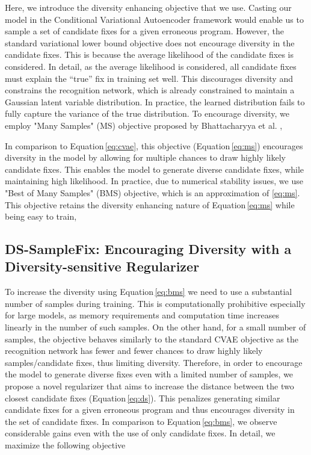 \documentclass[runningheads]{llncs}
\newcommand{\dssmaplefix}{DS-SampleFix}
\newcommand{\equref}{Equation}
\begin{document}
Here, we introduce the diversity enhancing objective that we use. Casting our model in the Conditional Variational Autoencoder framework would enable us to sample a set of candidate fixes for a given erroneous program. However, the standard variational lower bound objective does not encourage diversity in the candidate fixes. This is because the average likelihood of the candidate fixes is considered. In detail, as the average likelihood is considered, all candidate fixes must explain the ``true'' fix in training set well. This discourages diversity and constrains the recognition network, which is already constrained to maintain a Gaussian latent variable distribution. In practice, the learned distribution fails to fully capture the variance of the true distribution. To encourage diversity, 
we employ "Many Samples" (MS) objective proposed by Bhattacharyya
et al. \cite{bhattacharyya2018accurate},


In comparison to \equref \,\ref{eq:cvae}, this objective (\equref \,\ref{eq:ms}) encourages diversity in the model by allowing for multiple chances to draw highly likely candidate fixes. This enables the model to generate diverse candidate fixes, while maintaining high likelihood. In practice, due to numerical stability issues, 
we use "Best of Many Samples" (BMS) objective, which is an approximation of \ref{eq:ms}. This objective retains the diversity enhancing nature of \equref \,\ref{eq:ms} while being easy to train,



\subsection{\dssmaplefix: Encouraging Diversity with a Diversity-sensitive Regularizer}
\label{subsec:ds}
To increase the diversity using \equref \,\ref{eq:bms} we need to use a substantial number  of samples  during training. This is computationally prohibitive especially for large models, as memory requirements and computation time increases linearly in the number of such samples. On the other hand, for a small number of samples, the objective behaves similarly to the standard CVAE objective as the recognition network has fewer and fewer chances to draw highly likely samples/candidate fixes, thus limiting diversity. Therefore, in order to encourage the model to generate diverse fixes even with a limited number of samples, 
we propose a novel regularizer that aims to increase the distance between the two closest candidate fixes  (\equref \,\ref{eq:ds}). This
penalizes generating similar candidate fixes for a given erroneous program and thus encourages diversity in the set of candidate fixes. In comparison to \equref \,\ref{eq:bms}, we observe considerable gains even with the use of only  candidate fixes. In detail, we maximize the following objective
\end{document}
